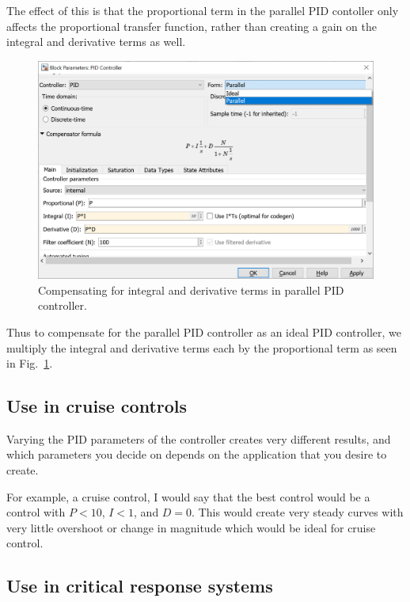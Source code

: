 \documentclass[12pt]{article}
\begin{document}
The effect of this is that the proportional term
in the parallel PID contoller
only affects the proportional transfer function,
rather than creating a gain on the integral and derivative terms as well.

\begin{figure}
    \centering
    \includegraphics[width=\linewidth]{img/discussion_parallel_pid.png}
    \caption{Compensating for integral and derivative terms in parallel PID controller.}
    \label{fig:parallel pid controller block parameters}
\end{figure}

Thus to compensate for the parallel PID controller
as an ideal PID controller,
we multiply the integral and derivative terms each by the proportional term
as seen in Fig.~\ref{fig:parallel pid controller block parameters}.

\subsection{Use in cruise controls}

Varying the PID parameters of the controller creates very different results, and which parameters you decide on depends on the application that you desire to create.

For example, a cruise control, I would say that the best control would be a control with $P < 10$, $I < 1$, and $D = 0$. This would create very steady curves with very little overshoot or change in magnitude which would be ideal for cruise control.

\subsection{Use in critical response systems}
\end{document}
